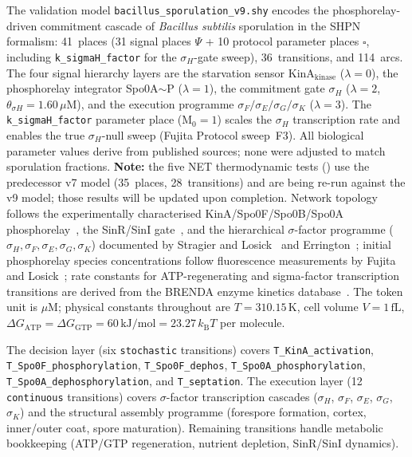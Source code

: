 \documentclass[11pt,a4paper]{article}
\newcommand{\kB}{k_{\mathrm{B}}}
\begin{document}
The validation model
\mbox{\texttt{bacillus\_sporulation\_v9.shy}}
encodes the phosphorelay-driven commitment cascade of \textit{Bacillus
subtilis} sporulation in the SHPN formalism: 41~places
(31 signal places $\Psi$ + 10 protocol parameter places $\square$,
including \texttt{k\_sigmaH\_factor} for the $\sigma_H$-gate sweep),
36~transitions, and 114~arcs.  The four signal hierarchy layers are
the starvation sensor KinA$_{\mathrm{kinase}}$ ($\lambda = 0$),
the phosphorelay integrator Spo0A$\sim$P ($\lambda = 1$),
the commitment gate $\sigma_H$ ($\lambda = 2$, $\theta_{\sigma H} = 1.60\,\mu$M),
and the execution programme $\sigma_F/\sigma_E/\sigma_G/\sigma_K$ ($\lambda = 3$).
The \texttt{k\_sigmaH\_factor} parameter place (M$_0 = 1$) scales the
$\sigma_H$ transcription rate and enables the true $\sigma_H$-null sweep
(Fujita Protocol sweep~F3).  All biological parameter values derive from
published sources; none were adjusted to match sporulation fractions.
\textbf{Note:} the five NET thermodynamic tests () use the
predecessor v7 model (35~places, 28~transitions) and are being re-run
against the v9 model; those results will be updated upon completion.
Network topology follows the experimentally characterised
KinA/Spo0F/Spo0B/Spo0A phosphorelay~\cite{Burbulys1991},
the SinR/SinI gate~\cite{Fujita2005},
and the hierarchical \(\sigma\)-factor programme
(\(\sigma_H, \sigma_F, \sigma_E, \sigma_G, \sigma_K\)) documented by
Stragier and Losick~\cite{Stragier1996} and Errington~\cite{Errington2003};
initial phosphorelay species concentrations follow fluorescence
measurements by Fujita and Losick~\cite{Fujita2005}; rate constants
for ATP-regenerating and sigma-factor transcription transitions are
derived from the BRENDA enzyme kinetics database~\cite{BRENDA}.
The token unit is \(\mu\)M; physical constants throughout are
\(T = 310.15\,\mathrm{K}\), cell volume \(V = 1\,\mathrm{fL}\),
\(\Delta G_{\mathrm{ATP}} = \Delta G_{\mathrm{GTP}} = 60\,\mathrm{kJ/mol}
= 23.27\,\kB T\) per molecule.

\begin{sloppypar}
The decision layer (six \texttt{stochastic} transitions) covers
\texttt{T\_KinA\_activation}, \texttt{T\_Spo0F\_phosphorylation},
\texttt{T\_Spo0F\_dephos}, \texttt{T\_Spo0A\_\allowbreak phosphorylation},
\texttt{T\_Spo0A\_dephosphorylation}, and \texttt{T\_septation}.  The
execution layer (12 \texttt{continuous} transitions) covers
\(\sigma\)-factor transcription cascades (\(\sigma_H\), \(\sigma_F\),
\(\sigma_E\), \(\sigma_G\), \(\sigma_K\)) and the structural assembly
programme (forespore formation, cortex, inner/outer coat, spore
maturation).  Remaining transitions handle metabolic bookkeeping
(ATP/GTP regeneration, nutrient depletion, SinR/SinI dynamics).
\end{sloppypar}
\end{document}
